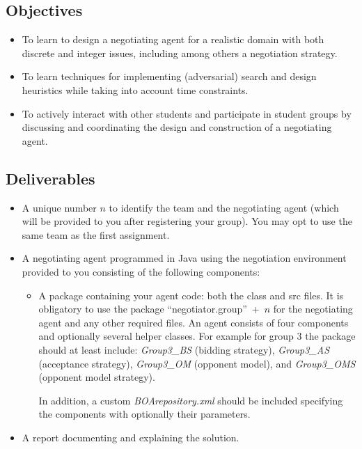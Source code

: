 \documentclass[a4paper]{article}
\begin{document}
\subsection{Objectives}
\begin{itemize}
\item To learn to design a negotiating agent for a realistic domain with both discrete and integer issues, including among others a negotiation strategy.
\item To learn techniques for implementing (adversarial) search and design heuristics while taking into account time constraints.
\item To actively interact with other students and participate in student groups by discussing and coordinating the design and construction of a negotiating agent.
\end{itemize}


\subsection{Deliverables}

\begin{itemize}
\item A unique number $n$ to identify the team and the negotiating agent (which will be provided to you after registering your group). You may opt to use the same team as the first assignment.
\item A negotiating agent programmed in Java using the negotiation environment provided to you consisting of the following components:
  \begin{itemize}
    \item A package containing your agent code: both the class and src files. It is obligatory to use the package ``negotiator.group''~+~$n$ for the negotiating agent and any other required files. An agent consists of four components and optionally several helper classes. For example for group 3 the package should at least include: \textit{Group3\_BS} (bidding strategy), \textit{Group3\_AS} (acceptance strategy),\textit{ Group3\_OM} (opponent model), and \textit{Group3\_OMS} (opponent model strategy).

 In addition, a custom \textit{BOArepository.xml} should be included specifying the components with optionally their parameters.
  \end{itemize}
\item A report documenting and explaining the solution.
\end{itemize}
\end{document}
